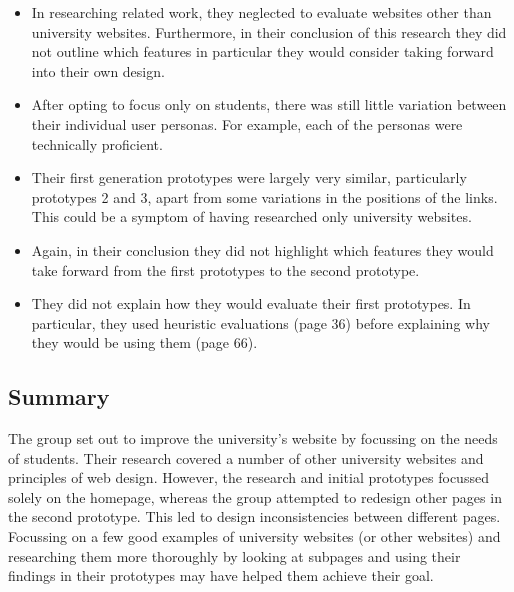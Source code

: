 \begin{itemize}

	\item  In researching related work, they neglected to evaluate websites
	other than university websites. Furthermore, in their conclusion of this
	research they did not outline which features in particular they would
	consider taking forward into their own design.

	\item After opting to focus only on students, there was still little
	variation between their individual user personas. For example, each of the
	personas were technically proficient.

	\item Their first generation prototypes were largely very similar,
	particularly prototypes 2 and 3, apart from some variations in the
	positions of the links.  This could be a symptom of having researched only
	university websites.

	\item Again, in their conclusion they did not highlight which features they
	would take forward from the first prototypes to the second prototype.

	\item They did not explain how they would evaluate their first prototypes.
	In particular, they used heuristic evaluations (page 36) before explaining
	why they would be using them (page 66).

\end{itemize}

\subsection{Summary}

The group set out to improve the university’s website by focussing on the needs
of students. Their research covered a number of other university websites and
principles of web design. However, the research and initial prototypes focussed
solely on the homepage, whereas the group attempted to redesign other pages in
the second prototype. This led to design inconsistencies between different
pages. Focussing on a few good examples of university websites (or other
websites) and researching them more thoroughly by looking at subpages and using
their findings in their prototypes may have helped them achieve their goal.

